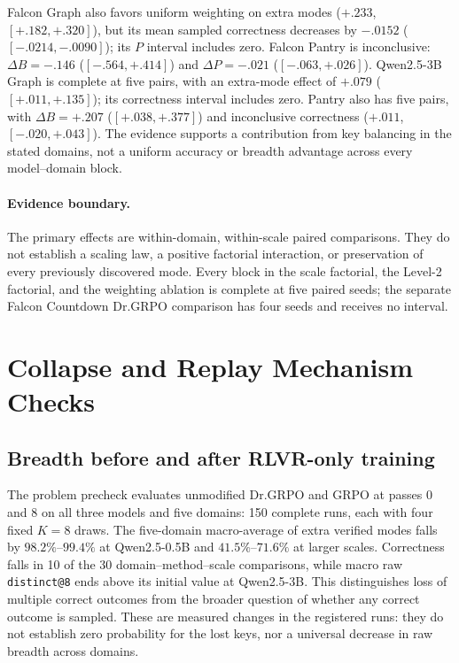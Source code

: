 \documentclass{article}
\newcommand{\1}{\mathbf 1}
\theoremstyle{remark}
\theoremstyle{definition}
\theoremstyle{plain}
\begin{document}
Falcon Graph also favors uniform weighting on extra modes ($+.233$,
$[+.182,+.320]$), but its mean sampled correctness decreases by $-.0152$
($[-.0214,-.0090]$); its $P$ interval includes zero. Falcon Pantry is
inconclusive: $\Delta B=-.146$ ($[-.564,+.414]$) and $\Delta P=-.021$
($[-.063,+.026]$). Qwen2.5-3B Graph is complete at five pairs, with an extra-mode effect of
$+.079$ ($[+.011,+.135]$); its correctness interval includes zero.
Pantry also has five pairs, with $\Delta B=+.207$
($[+.038,+.377]$) and inconclusive correctness ($+.011$, $[-.020,+.043]$).
The evidence supports a contribution from key balancing in the stated domains, not a
uniform accuracy or breadth advantage across every model--domain block.

\paragraph{Evidence boundary.}
\label{app:scale-boundary}
The primary effects are within-domain, within-scale paired comparisons.
They do not establish a scaling law, a positive factorial interaction, or
preservation of every previously discovered mode. Every block in the scale
factorial, the Level-2 factorial, and the weighting ablation is complete at
five paired seeds; the separate Falcon Countdown Dr.GRPO comparison has four
seeds and receives no interval.



\section{Collapse and Replay Mechanism Checks}
\label{app:ablations}




\subsection{Breadth before and after RLVR-only training}
\label{app:pre-rl-regression}

The problem precheck evaluates unmodified Dr.GRPO and GRPO at passes 0 and 8
on all three models and five domains: 150 complete runs, each with four
fixed $K=8$ draws. The five-domain macro-average of extra verified modes
falls by $98.2\%$--$99.4\%$ at Qwen2.5-0.5B and $41.5\%$--$71.6\%$ at
larger scales. Correctness falls in 10 of the 30 domain--method--scale
comparisons, while macro raw \texttt{distinct@8} ends above its initial
value at Qwen2.5-3B. This distinguishes loss of multiple correct outcomes
from the broader question of whether any correct outcome is sampled.
These are measured changes in the registered runs: they do not establish
zero probability for the lost keys, nor a universal decrease in raw breadth
across domains.
\end{document}
